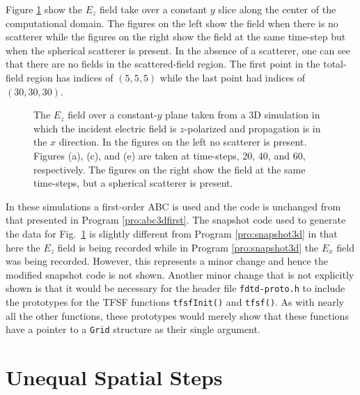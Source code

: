 Figure \ref{fig:3dTfsfDemo} show the $E_z$ field take over a constant
$y$ slice along the center of the computational domain.  The figures on
the left show the field when there is no scatterer while the figures
on the right show the field at the same time-step but when the
spherical scatterer is present.  In the absence of a scatterer, one
can see that there are no fields in the scattered-field region.  The
first point in the total-field region has indices of $(5,5,5)$ while
the last point had indices of $(30,30,30)$.

\begin{figure}
  \begin{center}
  \end{center} 
  \caption{The $E_z$ field over a constant-$y$ plane taken from a 3D
    simulation in which the incident electric field is $z$-polarized
    and propagation is in the $x$ direction.  In the figures on the
    left no scatterer is present.  Figures (a), (c), and (e) are taken
    at time-steps, 20, 40, and 60, respectively.  The figures on the
    right show the field at the same time-steps, but a spherical
    scatterer is present.}
  \label{fig:3dTfsfDemo} 
\end{figure}

In these simulations a first-order ABC is used and the code is
unchanged from that presented in Program \ref{pro:abc3dfirst}.  The
snapshot code used to generate the data for Fig.\ \ref{fig:3dTfsfDemo}
is slightly different from Program \ref{pro:snapshot3d} in that here
the $E_z$ field is being recorded while in Program
\ref{pro:snapshot3d} the $E_x$ field was being recorded.  However,
this represents a minor change and hence the modified snapshot code is
not shown.  Another minor change that is not explicitly shown is that
it would be necessary for the header file {\tt fdtd-proto.h} to
include the prototypes for the TFSF functions {\tt tfsfInit()} and
{\tt tfsf()}.  As with nearly all the other functions, these
prototypes would merely show that these functions have a pointer to a
{\tt Grid} structure as their single argument.

\section{Unequal Spatial Steps}

